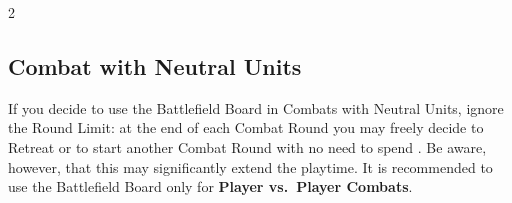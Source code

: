 \begin{expansion}
\begin{multicols*}{2}
    \subsection*{Combat with Neutral Units}
    If you decide to use the Battlefield Board in Combats with Neutral Units, ignore the Round Limit: at the end of each Combat Round you may freely decide to Retreat or to start another Combat Round with no need to spend .
    Be aware, however, that this may significantly extend the playtime.
    It is recommended to use the Battlefield Board only for \textbf{Player vs.~Player Combats}.
  \end{multicols*}
\end{expansion}
